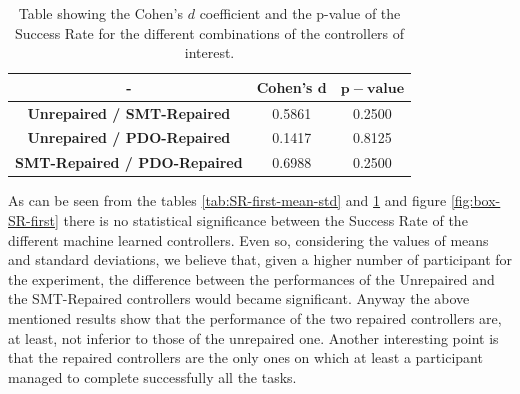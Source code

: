 \begin{table}[ht]
    \centering
    \begin{tabular}{|c|c|c|}
        \hline
        - & \textbf{Cohen's} $\mathbf{d}$ & $\mathbf{p-value}$ \\
        \hline
        \textbf{Unrepaired / SMT-Repaired} & 0.5861 & 0.2500 \\
        \textbf{Unrepaired / PDO-Repaired} & 0.1417 & 0.8125 \\
        \textbf{SMT-Repaired / PDO-Repaired} & 0.6988 & 0.2500 \\
        \hline
    \end{tabular}
    \caption{Table showing the Cohen's $d$ coefficient and the p-value of the Success Rate for the different combinations of the controllers of interest.}
    \label{tab:SR-first-cohen-p}
\end{table}
As can be seen from the tables \ref{tab:SR-first-mean-std} and \ref{tab:SR-first-cohen-p} and figure \ref{fig:box-SR-first} there is no statistical significance between the Success Rate of the different machine learned controllers. Even so, considering the values of means and standard deviations, we believe that, given a higher number of participant for the experiment, the difference between the performances of the Unrepaired and the SMT-Repaired controllers would became significant. Anyway the above mentioned results show that the performance of the two repaired controllers are, at least, not inferior to those of the unrepaired one. Another interesting point is that the repaired controllers are the only ones on which at least a participant managed to complete successfully all the tasks.
